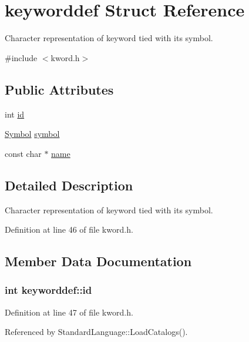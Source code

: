 \hypertarget{structkeyworddef}{}\section{keyworddef Struct Reference}
\label{structkeyworddef}


Character representation of keyword tied with its symbol.  




{\ttfamily \#include $<$kword.\+h$>$}

\subsection*{Public Attributes}
\begin{DoxyCompactItemize}
\item 
int \hyperlink{structkeyworddef_a7f5bc29bae784c5b8af94f858d500be5}{id}
\item 
\hyperlink{lex_8h_a7feef761cd73fac6e25b8bb80d2c4e54}{Symbol} \hyperlink{structkeyworddef_aec6598e221bbce9e131b30989f7e2cce}{symbol}
\item 
const char $\ast$ \hyperlink{structkeyworddef_a03b3d7dd316565c6fac8786186ec66c2}{name}
\end{DoxyCompactItemize}


\subsection{Detailed Description}
Character representation of keyword tied with its symbol. 

Definition at line 46 of file kword.\+h.



\subsection{Member Data Documentation}
\subsubsection[{\texorpdfstring{id}{id}}]{\setlength{\rightskip}{0pt plus 5cm}int keyworddef\+::id}\hypertarget{structkeyworddef_a7f5bc29bae784c5b8af94f858d500be5}{}\label{structkeyworddef_a7f5bc29bae784c5b8af94f858d500be5}


Definition at line 47 of file kword.\+h.



Referenced by Standard\+Language\+::\+Load\+Catalogs().


